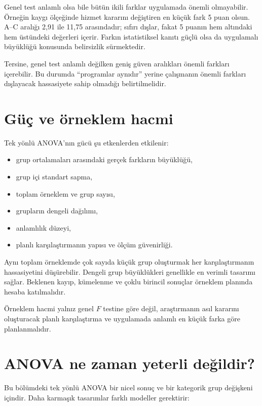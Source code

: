 Genel test anlamlı olsa bile bütün ikili farklar uygulamada önemli olmayabilir.
Örneğin kaygı ölçeğinde hizmet kararını değiştiren en küçük fark 5 puan olsun.
A--C aralığı 2,91 ile 11,75 arasındadır; sıfırı dışlar, fakat 5 puanın hem
altındaki hem üstündeki değerleri içerir. Farkın istatistiksel kanıtı güçlü
olsa da uygulamalı büyüklüğü konusunda belirsizlik sürmektedir.

Tersine, genel test anlamlı değilken geniş güven aralıkları önemli farkları
içerebilir. Bu durumda ``programlar aynıdır'' yerine çalışmanın önemli
farkları dışlayacak hassasiyete sahip olmadığı belirtilmelidir.

\section{Güç ve örneklem hacmi}

Tek yönlü ANOVA'nın gücü şu etkenlerden etkilenir:

\begin{itemize}
  \item grup ortalamaları arasındaki gerçek farkların büyüklüğü,
  \item grup içi standart sapma,
  \item toplam örneklem ve grup sayısı,
  \item grupların dengeli dağılımı,
  \item anlamlılık düzeyi,
  \item planlı karşılaştırmanın yapısı ve ölçüm güvenirliği.
\end{itemize}

Aynı toplam örneklemde çok sayıda küçük grup oluşturmak her karşılaştırmanın
hassasiyetini düşürebilir. Dengeli grup büyüklükleri genellikle en verimli
tasarımı sağlar. Beklenen kayıp, kümelenme ve çoklu birincil sonuçlar örneklem
planında hesaba katılmalıdır.

Örneklem hacmi yalnız genel $F$ testine göre değil, araştırmanın asıl kararını
oluşturacak planlı karşılaştırma ve uygulamada anlamlı en küçük farka göre
planlanmalıdır.

\section{ANOVA ne zaman yeterli değildir?}

Bu bölümdeki tek yönlü ANOVA bir nicel sonuç ve bir kategorik grup değişkeni
içindir. Daha karmaşık tasarımlar farklı modeller gerektirir:

